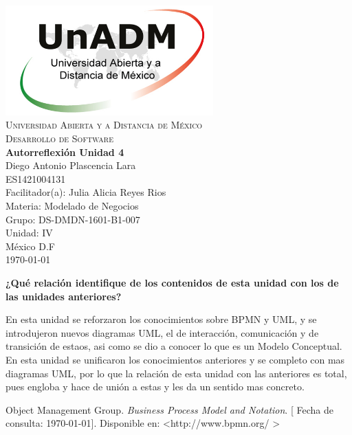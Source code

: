 \documentclass[spanish,12pt,letterpapper]{article}
\begin{document}
	\begin{titlepage}
		\begin{center}
			\includegraphics[width=0.6\textwidth]{../logoUnADM}~\\[1cm] 
			\textsc{Universidad Abierta y a Distancia de México}\\[0.8cm]
			\textsc{Desarrollo de Software}\\[1.8cm]
			
			\textbf{ \Large Autorreflexión Unidad 4}\\[3cm]
			
			Diego Antonio Plascencia Lara\\ ES1421004131 \\[0.4cm]
			Facilitador(a): Julia Alicia Reyes Rios\\
			Materia: Modelado de Negocios\\
			Grupo: DS-DMDN-1601-B1-007 \\
			Unidad: IV \\
			
			\vfill México D.F\\{\today}
			
		\end{center}
	\end{titlepage}
	
	\textbf{¿Qué relación identifique de los contenidos de esta unidad con los de las  unidades anteriores?\\}
	
	En esta unidad se reforzaron los conocimientos sobre BPMN y UML, y se introdujeron nuevos diagramas UML, el de interacción, comunicación y de transición de estaos, asi como se dio a conocer lo que es un Modelo Conceptual. En esta unidad se unificaron los conocimientos anteriores y se completo con mas diagramas UML, por lo que la relación de esta unidad con las anteriores es total, pues engloba y hace de unión a estas y les da un sentido mas concreto.
	
	
	\pagebreak
	\begin{thebibliography}{9}
	 Object Management Group. 
		\emph{Business Process Model and Notation}. {[} Fecha de consulta: \today {]}. Disponible en: \textless http://www.bpmn.org/ \textgreater	
	\end{thebibliography}
\end{document}
